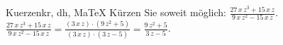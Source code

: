 \begin{MAufgabe}{Kuerzen}{kr, dh, MaTeX}
K\"urzen Sie soweit m\"oglich: $\frac{27\, x\, z^3 + 15\, x\, z}{9\, x\, z^2 - 15\, x\, z}$.\\ 
\ifLsg\MLoesung
\quad $\frac{27\, x\, z^3 + 15\, x\, z}{9\, x\, z^2 - 15\, x\, z}=\frac{(3\, x\, z)\cdot(9\, z^2 + 5)}{(3\, x\, z)\cdot(3\, z - 5)}=\frac{9\, z^2 + 5}{3\, z - 5}$.\else\relax\fi
 \end{MAufgabe}